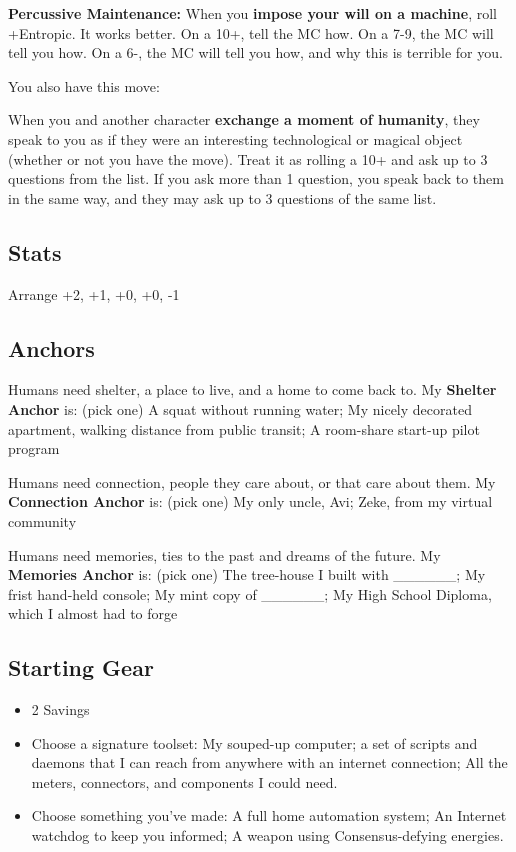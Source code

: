 \documentclass[
]{memoir}
\begin{document}
\textbf{Percussive Maintenance:} When you \textbf{impose your will on a
machine}, roll +Entropic. It works better. On a 10+, tell the MC how. On
a 7-9, the MC will tell you how. On a 6-, the MC will tell you how, and
why this is terrible for you.

You also have this move:

When you and another character \textbf{exchange a moment of humanity},
they speak to you as if they were an interesting technological or
magical object (whether or not you have the move). Treat it as rolling a
10+ and ask up to 3 questions from the list. If you ask more than 1
question, you speak back to them in the same way, and they may ask up to
3 questions of the same list.

\hypertarget{stats-7}{%
\subsection{Stats}\label{stats-7}}

Arrange +2, +1, +0, +0, -1

\hypertarget{anchors-6}{%
\subsection{Anchors}\label{anchors-6}}

Humans need shelter, a place to live, and a home to come back to. My
\textbf{Shelter Anchor} is: (pick one) A squat without running water; My
nicely decorated apartment, walking distance from public transit; A
room-share start-up pilot program

Humans need connection, people they care about, or that care about them.
My \textbf{Connection Anchor} is: (pick one) My only uncle, Avi; Zeke,
from my virtual community

Humans need memories, ties to the past and dreams of the future. My
\textbf{Memories Anchor} is: (pick one) The tree-house I built with
\_\_\_\_\_\_; My frist hand-held console; My mint copy of \_\_\_\_\_\_;
My High School Diploma, which I almost had to forge

\hypertarget{starting-gear-6}{%
\subsection{Starting Gear}\label{starting-gear-6}}

\begin{itemize}
\tightlist
\item
  2 Savings
\item
  Choose a signature toolset: My souped-up computer; a set of scripts
  and daemons that I can reach from anywhere with an internet
  connection; All the meters, connectors, and components I could need.
\item
  Choose something you've made: A full home automation system; An
  Internet watchdog to keep you informed; A weapon using
  Consensus-defying energies.
\end{itemize}
\end{document}
